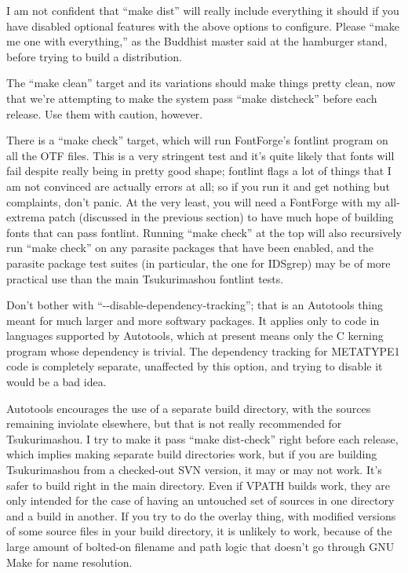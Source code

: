 \documentclass[14pt]{extarticle}
\begin{document}
I am not confident that ``make dist'' will really include everything it
should if you have disabled optional features with the above options to
configure.  Please ``make me one with everything,'' as the Buddhist master
said at the hamburger stand, before trying to build a distribution.

The ``make clean'' target and its variations should make things pretty
clean, now that we're attempting to make the system pass ``make distcheck''
before each release.  Use them with caution, however.

There is a ``make check'' target, which will run FontForge's fontlint
program on all the OTF files.  This is a very stringent test and it's quite
likely that fonts will fail despite really being in pretty good shape;
fontlint flags a lot of things that I am not convinced are actually errors
at all; so if you run it and get nothing but complaints, don't panic.  At
the very least, you will need a FontForge with my all-extrema patch
(discussed in the previous section) to have much hope of building fonts that
can pass fontlint.  Running ``make check'' at the top will also recursively
run ``make check'' on any parasite packages that have been enabled, and the
parasite package test suites (in particular, the one for IDSgrep) may be of
more practical use than the main Tsukurimashou fontlint tests.

Don't bother with ``-{}-disable-dependency-tracking''; that is an
Autotools thing meant for much larger and more softwary packages.  It
applies only to code in languages supported by Autotools, which at
present means only the C kerning program whose dependency is trivial. 
The dependency tracking for METATYPE1 code is completely separate,
unaffected by this option, and trying to disable it would be a bad
idea.

Autotools encourages the use of a separate build directory, with the
sources remaining inviolate elsewhere, but that is not really
recommended for Tsukurimashou.  I try to make it pass ``make
dist-check'' right before each release, which implies making separate
build directories work, but if you are building Tsukurimashou from a
checked-out SVN version, it may or may not work.  It's safer
to build right in the main directory.  Even if VPATH builds work, they
are only intended for the case of having an untouched set of sources in
one directory and a build in another.  If you try to do the overlay
thing, with modified versions of some source files in your build
directory, it is unlikely to work, because of the large amount of
bolted-on filename and path logic that doesn't go through GNU Make for
name resolution.
\end{document}
